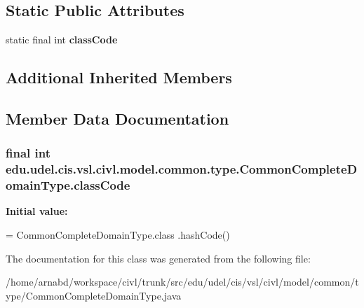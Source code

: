 \subsection*{Static Public Attributes}
\begin{DoxyCompactItemize}
\item 
static final int {\bfseries class\+Code}
\end{DoxyCompactItemize}
\subsection*{Additional Inherited Members}


\subsection{Member Data Documentation}
\hypertarget{classedu_1_1udel_1_1cis_1_1vsl_1_1civl_1_1model_1_1common_1_1type_1_1CommonCompleteDomainType_a35b178c49092b5fb34c67078a8545b5b}{}
\subsubsection[{class\+Code}]{\setlength{\rightskip}{0pt plus 5cm}final int edu.\+udel.\+cis.\+vsl.\+civl.\+model.\+common.\+type.\+Common\+Complete\+Domain\+Type.\+class\+Code\hspace{0.3cm}{\ttfamily [static]}}\label{classedu_1_1udel_1_1cis_1_1vsl_1_1civl_1_1model_1_1common_1_1type_1_1CommonCompleteDomainType_a35b178c49092b5fb34c67078a8545b5b}
{\bfseries Initial value\+:}
\begin{DoxyCode}
= CommonCompleteDomainType.class
            .hashCode()
\end{DoxyCode}


The documentation for this class was generated from the following file\+:\begin{DoxyCompactItemize}
\item 
/home/arnabd/workspace/civl/trunk/src/edu/udel/cis/vsl/civl/model/common/type/Common\+Complete\+Domain\+Type.\+java\end{DoxyCompactItemize}
